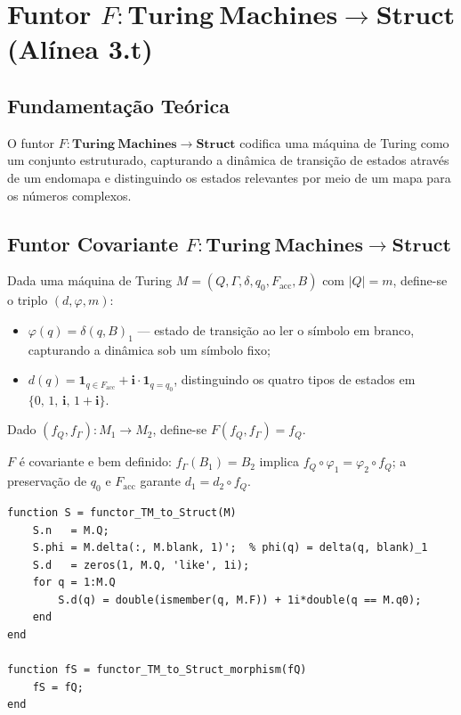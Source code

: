 \section{Funtor $F: \mathbf{Turing\ Machines} \to \mathbf{Struct}$ (Alínea 3.t)}
\label{sec:functor-turing-struct}

\subsection{Fundamentação Teórica}

O funtor $F: \mathbf{Turing\ Machines} \to \mathbf{Struct}$ codifica uma máquina de Turing como um conjunto estruturado, capturando a dinâmica de transição de estados através de um endomapa e distinguindo os estados relevantes por meio de um mapa para os números complexos.

\subsection{Funtor Covariante $F: \mathbf{Turing\ Machines} \to \mathbf{Struct}$}

\begin{definition}
Dada uma máquina de Turing $M = (Q, \Gamma, \delta, q_0, F_{\mathrm{acc}}, B)$ com $|Q| = m$, define-se o triplo $(d, \varphi, m)$:
\begin{itemize}
    \item $\varphi(q) = \delta(q, B)_1$ --- estado de transição ao ler o símbolo em branco, capturando a dinâmica sob um símbolo fixo;
    \item $d(q) = \mathbf{1}_{q \in F_{\mathrm{acc}}} + \mathbf{i} \cdot \mathbf{1}_{q = q_0}$, distinguindo os quatro tipos de estados em $\{0,\,1,\,\mathbf{i},\,1{+}\mathbf{i}\}$.
\end{itemize}
Dado $(f_Q, f_\Gamma): M_1 \to M_2$, define-se $F(f_Q, f_\Gamma) = f_Q$.
\end{definition}

\begin{proposition}
$F$ é covariante e bem definido: $f_\Gamma(B_1) = B_2$ implica $f_Q \circ \varphi_1 = \varphi_2 \circ f_Q$; a preservação de $q_0$ e $F_{\mathrm{acc}}$ garante $d_1 = d_2 \circ f_Q$.
\end{proposition}

\begin{lstlisting}[style=matlab, caption={Funtor covariante $F: \mathbf{Turing\ Machines} \to \mathbf{Struct}$}]
function S = functor_TM_to_Struct(M)
    S.n   = M.Q;
    S.phi = M.delta(:, M.blank, 1)';  % phi(q) = delta(q, blank)_1
    S.d   = zeros(1, M.Q, 'like', 1i);
    for q = 1:M.Q
        S.d(q) = double(ismember(q, M.F)) + 1i*double(q == M.q0);
    end
end

function fS = functor_TM_to_Struct_morphism(fQ)
    fS = fQ;
end
\end{lstlisting}

